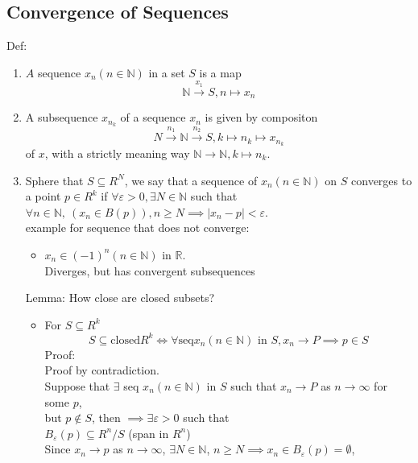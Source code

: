\documentclass[../main.tex]{subfiles}
\begin{document}
\subsection{Convergence of Sequences}
Def:
\begin{enumerate}
  \item $A$ sequence $x_n(n\in \mathbb{N})$ in a set $S$ is a map
  \begin{equation}
  \mathbb N \xrightarrow{x_1} S, n \mapsto x_n
  \end{equation}
\item A subsequence $x_{n_k}$ of a sequence $x_n$ is given by compositon
\begin{equation}
N \xrightarrow{n_1} \mathbb N \xrightarrow{n_2} S, k \mapsto n_k \mapsto x_{n_k}
\end{equation}
of $x$, with a strictly meaning way $\mathbb N \to \mathbb N, k \mapsto n_k$.
\item Sphere that $S \subseteq R^N$, we say that a sequence of $x_n(n\in \mathbb{N})$ on $S$ converges to a point $p\in R^k$ if
$\forall \varepsilon > 0, \exists N \in \mathbb{N}$ such that
$\forall n \in \mathbb{N},~(x_n\in B(p)), n \geq N \implies \left|x_n - p\right| < \varepsilon$.\\
example for sequence that does not converge:
\begin{itemize}
  \item $x_n \in (-1)^n (n\in \mathbb{N})$ in $\mathbb{R}$.\\
  Diverges, but has convergent subsequences
\end{itemize}
Lemma: How close are closed subsets?
\begin{itemize}
  \item For $S \subseteq R^k$
  \begin{equation}
  \boxed{S \subseteq \text{closed} R^k \Leftrightarrow \forall \text{seq} x_n(n\in \mathbb{N}) \text{ in } S,
   x_n \to P \implies p \in S
  }
  \end{equation}
  Proof:\\
  Proof by contradiction.\\
  Suppose that $\exists$ seq $x_n(n \in \mathbb{N})$ in $S$ such that
  $x_n \to P$ as $n \to \infty$ for some $p$,\\
  but $p\notin S$, then $\implies \exists \varepsilon >0$ such that\\
  $B_\varepsilon(p) \subseteq R^n / S$ (span in $R^n$)\\
  Since $x_n \to p$ as $n \to \infty$, $\exists N \in \mathbb{N}$, $n \geq N \implies x_n \in B_\varepsilon(p) = \emptyset$,

\end{itemize}
\end{enumerate}
\end{document}
